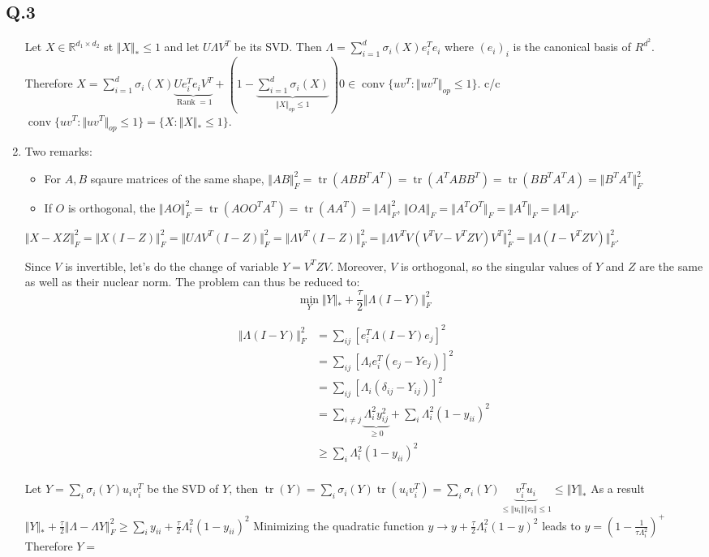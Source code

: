 \documentclass[12pt]{article}
\newcommand{\Q}[1]{\subsection*{Q.#1}}
\newenvironment{question}[1]
{\Q{#1}}{}
\newcommand{\norm}[1]{\Vert #1 \Vert}
\newcommand{\fnorm}[1]{\Vert #1 \Vert_F}
\newcommand{\nucnorm}[1]{\Vert #1 \Vert_*}
\DeclareMathOperator{\tr}{tr}
\DeclareMathOperator{\rank}{Rank}
\DeclareMathOperator{\conv}{conv}
\begin{document}
\begin{question}{3}
\begin{enumerate}
    Let $X \in \mathbb R^{d_1 \times d_2}$ st $\Vert X\Vert _* \le 1$ and let $U\Lambda V^T$ be its SVD. Then $\Lambda = \sum_{i=1}^d \sigma_i(X) e_i^Te_i$ where $(e_i)_i$ is the canonical basis of $R^{d^2}$.
    Therefore $X = \sum_{i=1}^d \sigma_i(X) \underbrace{Ue_i^Te_iV^T}_{\rank =1} + (1 - \underbrace{\sum_{i=1}^d \sigma_i(X)}_{\Vert X\Vert _{op} \le 1}) 0 \in \conv \{ uv^T : \Vert uv^T\Vert _{op} \le 1 \}  $.
    c/c     $\conv \{ uv^T : \Vert uv^T\Vert _{op} \le 1 \} = \{ X : \Vert X\Vert _{*} \le  1\}$.
  \item 
    Two remarks:
    \begin{itemize}
    \item For $A, B$ sqaure matrices of the same shape, $\Vert AB\Vert _F^2 = \tr(ABB^TA^T) = \tr(A^TA BB^T) =  \tr(BB^T A^TA) = \Vert B^TA^T\Vert _F^2$
    \item If $O$ is orthogonal, the $\Vert AO\Vert _F^2 = \tr(AOO^TA^T) = \tr(AA^T) = \Vert A\Vert _F^2$, $\Vert OA\Vert _F = \Vert A^TO^T\Vert _F = \Vert A^T\Vert _F = \Vert A\Vert _F$.
    \end{itemize}

    $\Vert X - XZ\Vert _F^2 = \Vert X (I - Z)\Vert _F^2 = \Vert U \Lambda V^T(I - Z)\Vert _F^2 = \Vert \Lambda V^T(I - Z)\Vert _F^2 = \Vert \Lambda V^T V(V^TV - V^TZV)V^T\Vert _F^2 = \Vert \Lambda (I - V^TZV)\Vert _F^2$.

    Since $V$ is invertible, let's do the change of variable $Y = V^TZV$. Moreover, $V$ is orthogonal, so the singular values of $Y$ and $Z$ are the same as well as their nuclear norm. The problem can thus be reduced to:
    $$\min_Y \Vert Y\Vert _* + \frac{\tau}2 \Vert \Lambda(I -  Y)\Vert _F^2$$

    \begin{align*}
      \fnorm{\Lambda (I - Y)}^2 &= \sum_{ij} [e_i^T \Lambda (I - Y)e_j]^2 \\
                                &= \sum_{ij} [\Lambda_i e_i^T(e_j - Ye_j)]^2 \\
                                &= \sum_{ij} [\Lambda_i (\delta_{ij} - Y_{ij})]^2 \\
                                &= \sum_{i \ne j} \underbrace{\Lambda_i^2 y_{ij}^2}_{\ge 0}  + \sum_i \Lambda_i^2 (1 - y_{ii})^2  \\
                                & \ge \sum_i \Lambda_i^2 (1 - y_{ii})^2  \\
    \end{align*}

    Let $Y = \sum_i \sigma_i(Y) u_iv_i^T$ be the SVD of $Y$, then $\tr(Y) = \sum_i \sigma_i(Y) \tr(u_iv_i^T)= \sum_i \sigma_i(Y) \underbrace{v_i^Tu_i}_{\le \norm{u_i}\norm{v_i} \le 1} \le \nucnorm{Y}$
    As a result $\nucnorm{Y} + \frac{\tau}2 \fnorm{\Lambda - \Lambda Y}^2 \ge \sum_i y_{ii} + \frac{\tau} 2 \Lambda_i^2(1 - y_{ii})^2$
    Minimizing the quadratic function $y \rightarrow y + \frac{\tau}2 \Lambda_i^2 (1 - y)^2$ leads to $y = (1 - \frac1{\tau \Lambda_i^2})^+$
    Therefore $Y = $
  \end{enumerate}
  
\end{question}
\end{document}
